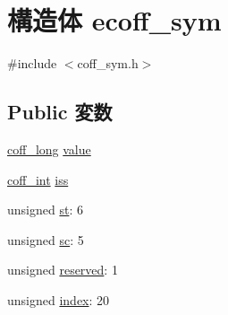 \hypertarget{structecoff__sym}{
\section{構造体 ecoff\_\-sym}
\label{structecoff__sym}
}


{\ttfamily \#include $<$coff\_\-sym.h$>$}\subsection*{Public 変数}
\begin{DoxyCompactItemize}
\item 
\hyperlink{ecoff__machdep_8h_a27e096276a8edabb9a2f02f101db01c7}{coff\_\-long} \hyperlink{structecoff__sym_a5a9763340498bedad4bd83abdaaa3f0a}{value}
\item 
\hyperlink{ecoff__machdep_8h_a484fbe8ab04f62e9ac2341a8275f3c35}{coff\_\-int} \hyperlink{structecoff__sym_afbddcadc409c0ae593b2d7e4d5a368de}{iss}
\item 
unsigned \hyperlink{structecoff__sym_ad31a126434d7ce705a87f60e04d987b2}{st}: 6
\item 
unsigned \hyperlink{structecoff__sym_afeb925285a478f289b24ee0d0c59e96f}{sc}: 5
\item 
unsigned \hyperlink{structecoff__sym_a6a6017ea077b575677a11d733ec137a3}{reserved}: 1
\item 
unsigned \hyperlink{structecoff__sym_a360ebf6209d16512186ca7adb893abbb}{index}: 20
\end{DoxyCompactItemize}


